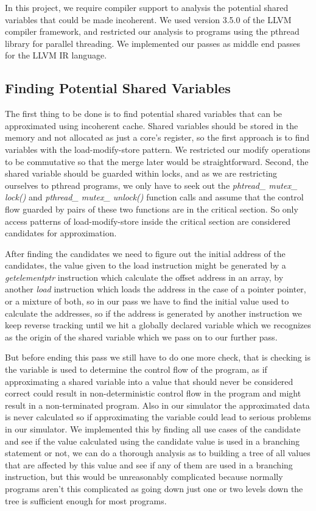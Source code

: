 \documentclass[12pt,conference]{IEEEtran}
\begin{document}
In this project, we require compiler support to analysis the potential
shared variables that could be made incoherent. We used version 3.5.0
of the LLVM compiler framework\cite{llvm}, and restricted our analysis
to programs using the pthread library for parallel threading.
We implemented our passes as middle end passes for the LLVM IR language.

\subsection{Finding Potential Shared Variables}

The first thing to be done is to find potential shared variables that
can be approximated using incoherent cache. Shared variables should be
stored in the memory and not allocated as just a core's register, so 
the first approach is to find variables with the load-modify-store
pattern. We restricted our modify operations to be commutative so that
the merge later would be straightforward. Second, the shared variable
should be guarded within locks, and as we are restricting ourselves to
pthread programs, we only have to seek out the 
\textit{phtread\_ mutex\_ lock()} and \textit{pthread\_ mutex\_ unlock()} 
function calls and assume that the control flow guarded by pairs of
these two functions are in the critical section. So only access patterns
of load-modify-store inside the critical section are considered candidates
for approximation.

After finding the candidates we need to figure out the initial address of
the candidates, the value given to the load instruction might be generated
by a \textit{getelementptr} instruction which calculate the offset address
in an array, by another \textit{load} instruction which loads the address 
in the case of a pointer pointer, or a mixture of both, so in our pass we 
have to find the initial value used to calculate the addresses, so if the 
address is generated by another instruction we keep reverse tracking until 
we hit a globally declared variable which we recognizes as the origin of the
shared variable which we pass on to our further pass.

But before ending this pass we still have to do one more check, that is 
checking is the variable is used to determine the control flow of the
program, as if approximating a shared variable into a value that should
never be considered correct could result in non-deterministic control 
flow in the program and might result in a non-terminated program. Also
in our simulator the approximated data is never calculated so if
approximating the variable could lead to serious problems in our
simulator. We implemented this by finding all use cases of the candidate
and see if the value calculated using the candidate value is used in 
a branching statement or not, we can do a thorough analysis as to building
a tree of all values that are affected by this value and see if any of
them are used in a branching instruction, but this would be unreasonably
complicated because normally programs aren't this complicated as going down
just one or two levels down the tree is sufficient enough for most programs.
\end{document}
